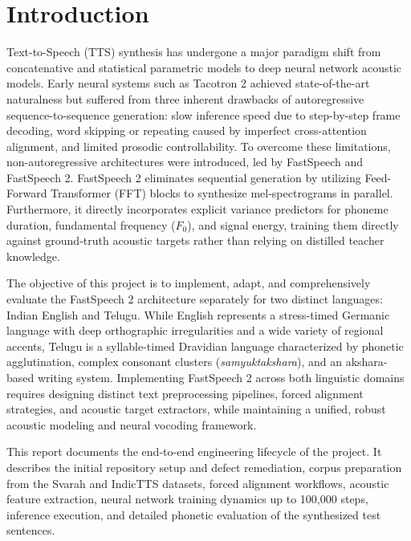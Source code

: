 \documentclass[11pt,a4paper]{article}
\begin{document}
\section{Introduction}
Text-to-Speech (TTS) synthesis has undergone a major paradigm shift from concatenative and statistical parametric models to deep neural network acoustic models. Early neural systems such as Tacotron 2 achieved state-of-the-art naturalness but suffered from three inherent drawbacks of autoregressive sequence-to-sequence generation: slow inference speed due to step-by-step frame decoding, word skipping or repeating caused by imperfect cross-attention alignment, and limited prosodic controllability. To overcome these limitations, non-autoregressive architectures were introduced, led by FastSpeech and FastSpeech 2. FastSpeech 2 eliminates sequential generation by utilizing Feed-Forward Transformer (FFT) blocks to synthesize mel-spectrograms in parallel. Furthermore, it directly incorporates explicit variance predictors for phoneme duration, fundamental frequency ($F_0$), and signal energy, training them directly against ground-truth acoustic targets rather than relying on distilled teacher knowledge.

The objective of this project is to implement, adapt, and comprehensively evaluate the FastSpeech 2 architecture separately for two distinct languages: Indian English and Telugu. While English represents a stress-timed Germanic language with deep orthographic irregularities and a wide variety of regional accents, Telugu is a syllable-timed Dravidian language characterized by phonetic agglutination, complex consonant clusters (\textit{samyuktakshara}), and an akshara-based writing system. Implementing FastSpeech 2 across both linguistic domains requires designing distinct text preprocessing pipelines, forced alignment strategies, and acoustic target extractors, while maintaining a unified, robust acoustic modeling and neural vocoding framework.

This report documents the end-to-end engineering lifecycle of the project. It describes the initial repository setup and defect remediation, corpus preparation from the Svarah and IndicTTS datasets, forced alignment workflows, acoustic feature extraction, neural network training dynamics up to 100,000 steps, inference execution, and detailed phonetic evaluation of the synthesized test sentences.

\end{document}
